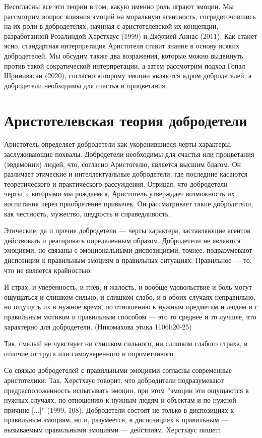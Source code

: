 \documentclass[11pt]{book}
\begin{document}
Несогласны все эти теории в том, какую именно роль играют эмоции. Мы рассмотрим вопрос влияния эмоций на моральную агентность, сосредоточившись на их роли в добродетелях, начиная с аристотелевской их концепции, разработанной Розалиндой Херстхаус (1999) и Джулией Аннас (2011). Как станет ясно, стандартная интерпретация Аристотеля ставит знание в основу всяких добродетелей. Мы обсудим также два возражения, которые можно выдвинуть против такой сократической интерпретации, а затем рассмотрим подход Гопал Шринивасан (2020), согласно которому эмоции являются ядром добродетелей, а добродетели необходимы для счастья и процветания.

\section{Аристотелевская теория добродетели}

Аристотель определяет добродетели как укоренившиеся черты характеры, заслуживающие похвалы. Добродетели необходимы для счастья или процветания (эвдемонии) людей, что, согласно Аристотелю, является высшим благом. Он различает этические и интеллектуальные добродетели, где последние касаются теоретического и практического рассуждения. Отрицая, что добродетели --- черты, с которыми мы рождаемся, Аристотель утверждает возможность их воспитания через приобретение привычек. Он рассматривает такие добродетели, как честность, мужество, щедрость и справедливость.

Этические, да и прочие добродетели --- черты характера, заставляющие агентов действовать и реагировать определенным образом. Добродетели не являются эмоциями, но связаны с эмоциональными диспозициями, точнее, подразумевают диспозиции к правильным эмоциям в правильных ситуациях. Правильное --- то, что не является крайностью:

\smallskip

И страх, и уверенность, и гнев, и жалость, и вообще удовольствие и боль могут ощущаться и слишком сильно, и слишком слабо, и в обоих случаях неправильно; но ощущать их в нужное время, по отношению к нужным предметам и людям и с правильным мотивом и правильным способом --- это то среднее и то лучшее, что характерно для добродетели. (Никомахова этика 1106b20-25)

\smallskip

Так, смелый не чувствует ни слишком сильного, ни слишком слабого страха, в отличие от труса или самоуверенного и опрометчивого.

Со связью добродетелей с правильными эмоциями согласны современные аристотелики. Так, Херстхаус говорит, что добродители подразумевают предрасположенность испытывать эмоции, при этом ''эмоции эти ощущаются в нужных случаях, по отношению к нужным людям и объектам и по нужной причине [...]'' (1999, 108). Добродетели состоят не только в диспозициях к правильным эмоциям, но и, разумеется, в диспозициях к правильным --- вызываемым правильными эмоциями --- действиям. Херстхаус пишет:
\end{document}
